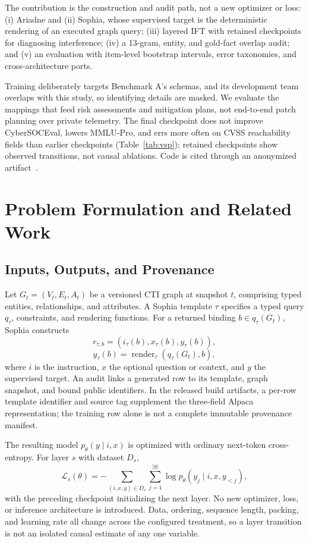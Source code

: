 \documentclass[conference]{IEEEtran}
\begin{document}
The contribution is the construction and audit path, not a new optimizer or loss: (i) Ariadne and (ii) Sophia, whose supervised target is the deterministic rendering of an executed graph query; (iii) layered IFT with retained checkpoints for diagnosing interference; (iv) a 13-gram, entity, and gold-fact overlap audit; and (v) an evaluation with item-level bootstrap intervals, error taxonomies, and cross-architecture ports.

Training deliberately targets Benchmark A's schemas, and its development team overlaps with this study, so identifying details are masked. We evaluate the mappings that feed risk assessments and mitigation plans, not end-to-end patch planning over private telemetry. The final checkpoint does not improve CyberSOCEval, lowers MMLU-Pro, and errs more often on CVSS reachability fields than earlier checkpoints (Table~\ref{tab:vsp}); retained checkpoints show observed transitions, not causal ablations. Code is cited through an anonymized artifact~\cite{anonartifact}.

\section{Problem Formulation and Related Work}
\subsection{Inputs, Outputs, and Provenance}
Let $G_t=(V_t,E_t,A_t)$ be a versioned CTI graph at snapshot $t$, comprising typed entities, relationships, and attributes. A Sophia template $\tau$ specifies a typed query $q_\tau$, constraints, and rendering functions. For a returned binding $b\in q_\tau(G_t)$, Sophia constructs
\begin{equation}
 r_{\tau,b}=\left(i_\tau(b),x_\tau(b),y_\tau(b)\right),
\end{equation}
\begin{equation}
 y_\tau(b)=\operatorname{render}_\tau\left(q_\tau(G_t),b\right),
\end{equation}
where $i$ is the instruction, $x$ the optional question or context, and $y$ the supervised target. An audit links a generated row to its template, graph snapshot, and bound public identifiers. In the released build artifacts, a per-row template identifier and source tag supplement the three-field Alpaca representation; the training row alone is not a complete immutable provenance manifest.

The resulting model $p_\theta(y\mid i,x)$ is optimized with ordinary next-token cross-entropy. For layer $s$ with dataset $D_s$,
\begin{equation}
 \mathcal{L}_s(\theta)=-\sum_{(i,x,y)\in D_s}\sum_{j=1}^{|y|}\log p_\theta(y_j\mid i,x,y_{<j}),
\end{equation}
with the preceding checkpoint initializing the next layer. No new optimizer, loss, or inference architecture is introduced. Data, ordering, sequence length, packing, and learning rate all change across the configured treatment, so a layer transition is not an isolated causal estimate of any one variable.
\end{document}
